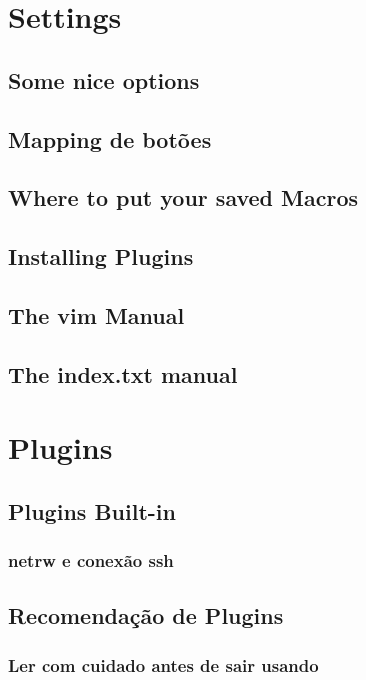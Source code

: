 \documentclass[a4paper, 12pt]{article}
\begin{document}
\section{Settings}
\subsection{Some nice options}
\subsection{Mapping de botões}
\subsection{Where to put your saved Macros}
\subsection{Installing Plugins}
\subsection{The vim Manual}
\subsection{The index.txt manual}
\section{Plugins}
\subsection{Plugins Built-in}
\subsubsection{netrw e conexão ssh}
\subsection{Recomendação de Plugins}
\subsubsection{Ler com cuidado antes de sair usando}

\end{document}

